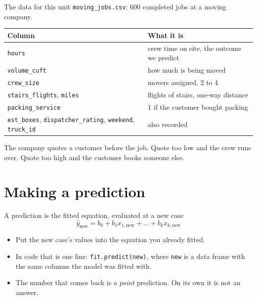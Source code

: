 \documentclass[aspectratio=169]{beamer}
\begin{document}
\begin{frame}{The data for this unit}
\texttt{moving\_jobs.csv}: 600 completed jobs at a moving company.
\begin{center}\small
\begin{tabular}{L{0.30\textwidth} L{0.60\textwidth}}
\toprule
\textbf{Column} & \textbf{What it is} \\
\midrule
\texttt{hours} & crew time on site, the outcome we predict \\
\texttt{volume\_cuft} & how much is being moved \\
\texttt{crew\_size} & movers assigned, 2 to 4 \\
\texttt{stairs\_flights}, \texttt{miles} & flights of stairs, one-way distance \\
\texttt{packing\_service} & 1 if the customer bought packing \\
\texttt{est\_boxes}, \texttt{dispatcher\_rating}, \texttt{weekend}, \texttt{truck\_id} & also recorded \\
\bottomrule
\end{tabular}
\end{center}
\vspace{0.3em}
The company quotes a customer before the job. Quote too low and the crew runs over.
Quote too high and the customer books someone else.
\end{frame}

\section{Making a prediction}
\begin{frame}{A prediction is the fitted equation, evaluated at a new case}
\[
   \hat{y}_{\text{new}} = b_0 + b_1 x_{1,\text{new}} + \dots + b_k x_{k,\text{new}}
\]
\begin{itemize}
  \item Put the new case's values into the equation you already fitted.
  \item In code that is one line: \texttt{fit.predict(new)}, where \texttt{new} is a data
        frame with the same columns the model was fitted with.
  \item The number that comes back is a \emph{point} prediction. On its own it is not an answer.
\end{itemize}
\end{frame}
\end{document}
